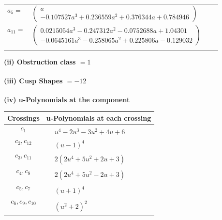 \documentclass[1p]{elsarticle_modified}
\theoremstyle{definition}
\begin{document}
\begin{tabular}{m{7pt} m{180pt} m{7pt} m{180pt} }
\flushright $a_{5}=$&$\begin{pmatrix}a\\-0.107527 a^{3}+0.236559 a^{2}+0.376344 a+0.784946\end{pmatrix}$ \\
\flushright $a_{11}=$&$\begin{pmatrix}0.0215054 a^{3}-0.247312 a^{2}-0.0752688 a+1.04301\\-0.0645161 a^{3}-0.258065 a^{2}+0.225806 a-0.129032\end{pmatrix}$\\&\end{tabular}
\flushleft \textbf{(ii) Obstruction class $= 1$}\\~\\
\flushleft \textbf{(iii) Cusp Shapes $= -12$}\\~\\
\newpage\renewcommand{\arraystretch}{1}
\flushleft \textbf{(iv) u-Polynomials at the component}\newline \\
\begin{tabular}{m{50pt}|m{274pt}}
Crossings & \hspace{64pt}u-Polynomials at each crossing \\
\hline $$\begin{aligned}c_{1}\end{aligned}$$&$\begin{aligned}
&u^4-2 u^3-3 u^2+4 u+6
\end{aligned}$\\
\hline $$\begin{aligned}c_{2},c_{12}\end{aligned}$$&$\begin{aligned}
&(u-1)^4
\end{aligned}$\\
\hline $$\begin{aligned}c_{3},c_{11}\end{aligned}$$&$\begin{aligned}
&2(2 u^4+5 u^2+2 u+3)
\end{aligned}$\\
\hline $$\begin{aligned}c_{4},c_{8}\end{aligned}$$&$\begin{aligned}
&2(2 u^4+5 u^2-2 u+3)
\end{aligned}$\\
\hline $$\begin{aligned}c_{5},c_{7}\end{aligned}$$&$\begin{aligned}
&(u+1)^4
\end{aligned}$\\
\hline $$\begin{aligned}c_{6},c_{9},c_{10}\end{aligned}$$&$\begin{aligned}
&(u^2+2)^2
\end{aligned}$\\
\hline
\end{tabular}\\~\\
\end{document}
